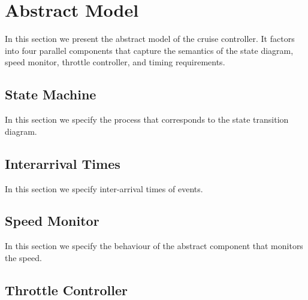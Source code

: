\documentclass{article}
\begin{document}


\section{Abstract Model}

In this section we present the abstract model of the cruise controller. It factors into four parallel components that capture the semantics of the state diagram, speed monitor, throttle controller, and timing requirements.


\subsection{State Machine}

In this section we specify the process that corresponds to the state transition diagram.
%



\subsection{Interarrival Times}

In this section we specify inter-arrival times of events.
%


\newpage


\subsection{Speed Monitor}

In this section we specify the behaviour of the abstract component that monitors the speed.
%



\subsection{Throttle Controller}
\end{document}
